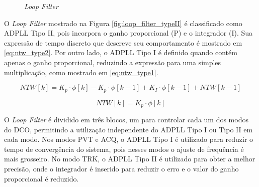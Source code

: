 \begin{figure}[htb]
	\caption{\textit{Loop Filter} }
	\begin{center}
	\hfil
	\end{center}
	\label{fig:loop_filter_structure}
\end{figure}

 O \textit{Loop Filter} mostrado na Figura \ref{fig:loop_filter_typeII} é classificado  como ADPLL Tipo II, pois incorpora  o ganho proporcional (P) e o integrador (I). Sua expressão de tempo discreto que descreve seu comportamento é mostrado em \ref{eq:ntw_type2}. Por outro lado, o ADPLL Tipo I é definido quando contém apenas o ganho proporcional,  reduzindo a expressão para uma simples multiplicação, como mostrado em \ref{eq:ntw_type1}.
 
 \begin{equation}
 	NTW[k]= K_p \cdot \phi [k] - K_p \cdot \phi [k -1] + K_I \cdot \phi [k-1] + NTW[k-1]
 	\label{eq:ntw_type2}
 \end{equation}
 
 \begin{equation}
 	NTW[k]= K_p \cdot \phi [k] 
 	\label{eq:ntw_type1}
 \end{equation}


O \textit{Loop Filter} é dividido em três blocos, um para controlar cada um dos modos do DCO,  permitindo a utilização independente do ADPLL Tipo I ou Tipo II em cada modo. Nos modos PVT e ACQ, o ADPLL Tipo I é utilizado para reduzir o tempo de convergência do sistema, pois nesses modos o ajuste de frequência é mais grosseiro. No modo TRK, o ADPLL Tipo II é utilizado para obter a melhor precisão, onde o integrador é inserido para reduzir o erro e o valor do ganho proporcional é reduzido.
 
